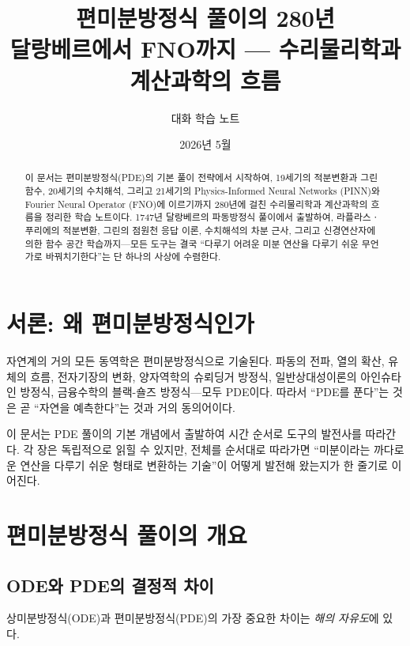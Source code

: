 \documentclass[11pt,a4paper]{article}
\title{\textbf{편미분방정식 풀이의 280년}\\[0.3em] \large 달랑베르에서 FNO까지 --- 수리물리학과 계산과학의 흐름}
\author{대화 학습 노트}
\date{2026년 5월}
\begin{document}
\maketitle

\begin{abstract}
이 문서는 편미분방정식(PDE)의 기본 풀이 전략에서 시작하여, 19세기의 적분변환과 그린 함수, 20세기의 수치해석, 그리고 21세기의 Physics-Informed Neural Networks (PINN)와 Fourier Neural Operator (FNO)에 이르기까지 280년에 걸친 수리물리학과 계산과학의 흐름을 정리한 학습 노트이다. 1747년 달랑베르의 파동방정식 풀이에서 출발하여, 라플라스ㆍ푸리에의 적분변환, 그린의 점원천 응답 이론, 수치해석의 차분 근사, 그리고 신경연산자에 의한 함수 공간 학습까지---모든 도구는 결국 ``다루기 어려운 미분 연산을 다루기 쉬운 무언가로 바꿔치기한다''는 단 하나의 사상에 수렴한다.
\end{abstract}

\tableofcontents
\newpage

\section{서론: 왜 편미분방정식인가}

자연계의 거의 모든 동역학은 편미분방정식으로 기술된다. 파동의 전파, 열의 확산, 유체의 흐름, 전자기장의 변화, 양자역학의 슈뢰딩거 방정식, 일반상대성이론의 아인슈타인 방정식, 금융수학의 블랙-숄즈 방정식---모두 PDE이다. 따라서 ``PDE를 푼다''는 것은 곧 ``자연을 예측한다''는 것과 거의 동의어이다.

이 문서는 PDE 풀이의 기본 개념에서 출발하여 시간 순서로 도구의 발전사를 따라간다. 각 장은 독립적으로 읽힐 수 있지만, 전체를 순서대로 따라가면 ``미분이라는 까다로운 연산을 다루기 쉬운 형태로 변환하는 기술''이 어떻게 발전해 왔는지가 한 줄기로 이어진다.

\section{편미분방정식 풀이의 개요}

\subsection{ODE와 PDE의 결정적 차이}

상미분방정식(ODE)과 편미분방정식(PDE)의 가장 중요한 차이는 \emph{해의 자유도}에 있다.
\end{document}
